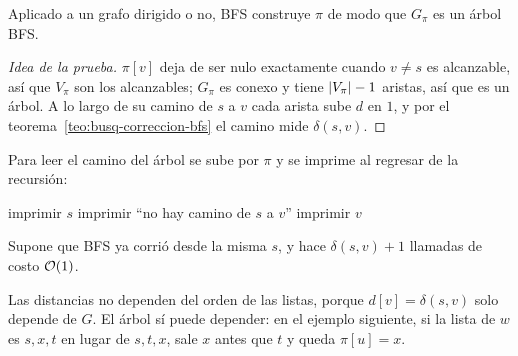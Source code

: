 \documentclass[11pt,letterpaper]{article}
\begin{document}
\begin{lema}
  \label{lem:busq-arbol-bfs}
  Aplicado a un grafo dirigido o no, BFS construye $\pi$ de modo que
  $G_\pi$ es un árbol BFS.
\end{lema}

\begin{proof}[Idea de la prueba]
  $\pi[v]$ deja de ser nulo exactamente cuando $v \neq s$ es
  alcanzable, así que $V_\pi$ son los alcanzables; $G_\pi$ es conexo y
  tiene $\left\lvert V_\pi \right\rvert - 1$ aristas, así que es un árbol. A lo largo de
  su camino de $s$ a $v$ cada arista sube $d$ en $1$, y por el
  teorema~\ref{teo:busq-correccion-bfs} el camino mide $\delta(s, v)$.
\end{proof}

Para leer el camino del árbol se sube por $\pi$ y se imprime al
regresar de la recursión:

\begin{algorithm}[H]
\caption{\textsc{Imprimir-Camino}$(G, s, v)$}
\label{alg:busq-imprimir-camino}
\begin{algorithmic}[1]
    \State imprimir $s$
    \State imprimir ``no hay camino de $s$ a $v$''
  \Else
    \State {}
    \State imprimir $v$
  \EndIf
\EndProcedure
\end{algorithmic}
\end{algorithm}

Supone que BFS ya corrió desde la misma $s$, y hace $\delta(s, v) + 1$
llamadas de costo $\mathcal{O}\!\left(1\right)$.

\begin{observacion}
  Las distancias no dependen del orden de las listas, porque
  $d[v] = \delta(s, v)$ solo depende de $G$. El árbol sí puede
  depender: en el ejemplo siguiente, si la lista de $w$ es $s, x, t$ en
  lugar de $s, t, x$, sale $x$ antes que $t$ y queda $\pi[u] = x$.
\end{observacion}
\end{document}
